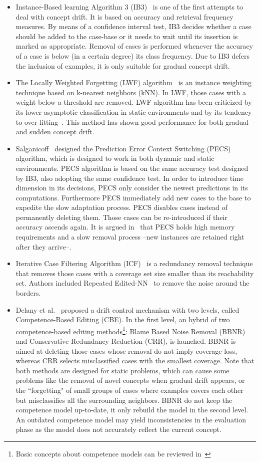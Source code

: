 \documentclass[preprint,12pt]{elsarticle}
\begin{document}
\begin{itemize}
\begin{itemize}
	\item Instance-Based learning Algorithm 3 (IB3)~\cite{aha91} is one of the first attempts to deal with concept drift. It is based on accuracy and retrieval frequency measures. By means of a confidence interval test, IB3 decides whether a case should be added to the case-base or it needs to wait until its insertion is marked as appropriate. Removal of cases is performed whenever the accuracy of a case is below (in a certain degree) its class frequency. Due to IB3 defers the inclusion of examples, it is only suitable for gradual concept drift. 
	\item The Locally Weighted Forgetting (LWF) algorithm~\cite{salga93} is an instance weighting technique based on k-nearest neighbors (kNN). In LWF, those cases with a weight below a threshold are removed. LWF algorithm has been criticized by its lower asymptotic classification in static environments and by its tendency to over-fitting~\cite{klinken04}. This method has shown good performance for both gradual and sudden concept drift. 
	\item Salganicoff~\cite{salga97} designed the Prediction Error Context Switching (PECS) algorithm, which is designed to work in both dynamic and static environments. PECS algorithm is based on the same accuracy test designed by IB3, also adopting the same confidence test. In order to introduce time dimension in its decisions, PECS only consider the newest predictions in its computations. Furthermore PECS immediately add new cases to the base to expedite the slow adaptation process. PECS disables cases instead of permanently deleting them. Those cases can be re-introduced if their accuracy ascends again. It is argued in~\cite{berin07} that PECS holds high memory requirements and a slow removal process --new instances are retained right after they arrive--.
	\item Iterative Case Filtering Algorithm (ICF)~\cite{brighton02} is a redundancy removal technique that removes those cases with a coverage set size smaller than its reachability set. Authors included Repeated Edited-NN~\cite{tomek76} to remove the noise around the borders.
	\item Delany et al.~\cite{delany05} proposed a drift control mechanism with two levels, called Competence-Based Editing (CBE). In the first level, an hybrid of two competence-based editing methods\footnote{Basic concepts about competence models can be reviewed in~\cite{smyth95}}: Blame Based Noise Removal (BBNR) and Conservative Redundancy Reduction (CRR), is launched. BBNR is aimed at deleting those cases whose removal do not imply coverage loss, whereas CRR selects misclassified cases with the smallest coverage. Note that both methods are designed for static problems, which can cause some problems like the removal of novel concepts when gradual drift appears, or the ``forgetting" of small groups of cases where examples covers each other but misclassifies all the surrounding neighbors. BBNR do not keep the competence model up-to-date, it only rebuild the model in the second level. An outdated competence model may yield inconsistencies in the evaluation phase as the model does not accurately reflect the current concept.

\end{itemize}
\end{itemize}
\end{document}
